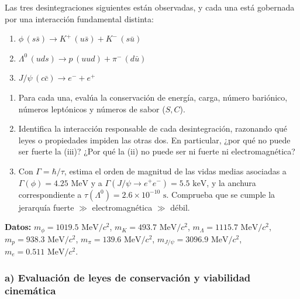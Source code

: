 \begin{problema}
Las tres desintegraciones siguientes están observadas, y cada una está gobernada por una interacción fundamental distinta:
\begin{enumerate}[label=(\roman*)]
    \item $\phi \, (s\bar{s}) \longrightarrow K^+ \, (u\bar{s}) + K^- \, (s\bar{u})$
    \item $\Lambda^0 \, (uds) \longrightarrow p \, (uud) + \pi^- \, (d\bar{u})$
    \item $J/\psi \, (c\bar{c}) \longrightarrow e^- + e^+$
\end{enumerate}

\begin{enumerate}[label=\alph*)]
    \item Para cada una, evalúa la conservación de energía, carga, número bariónico, números leptónicos y números de sabor ($S, C$).
    \item Identifica la interacción responsable de cada desintegración, razonando qué leyes o propiedades impiden las otras dos. En particular, ¿por qué no puede ser fuerte la (iii)? ¿Por qué la (ii) no puede ser ni fuerte ni electromagnética?
    \item Con $\Gamma = \hbar/\tau$, estima el orden de magnitud de las vidas medias asociadas a $\Gamma(\phi) = 4.25\text{ MeV}$ y a $\Gamma(J/\psi \rightarrow e^+e^-) = 5.5\text{ keV}$, y la anchura correspondiente a $\tau(\Lambda^0) = 2.6 \times 10^{-10}\text{ s}$. Comprueba que se cumple la jerarquía fuerte $\gg$ electromagnética $\gg$ débil.
\end{enumerate}

\textbf{Datos:} $m_\phi = 1019.5\text{ MeV}/c^2$, $m_K = 493.7\text{ MeV}/c^2$, $m_\Lambda = 1115.7\text{ MeV}/c^2$, $m_p = 938.3\text{ MeV}/c^2$, $m_\pi = 139.6\text{ MeV}/c^2$, $m_{J/\psi} = 3096.9\text{ MeV}/c^2$, $m_e = 0.511\text{ MeV}/c^2$.

\tcblower

\subsubsection*{a) Evaluación de leyes de conservación y viabilidad cinemática}


\end{problema}

